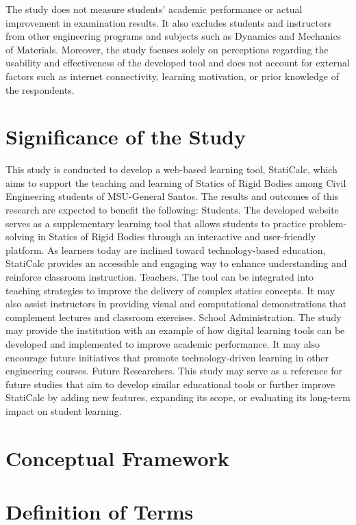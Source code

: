 The study does not measure students’ academic performance or actual improvement in examination results. It also excludes students and instructors from other engineering programs and subjects such as Dynamics and Mechanics of Materials. Moreover, the study focuses solely on perceptions regarding the usability and effectiveness of the developed tool and does not account for external factors such as internet connectivity, learning motivation, or prior knowledge of the respondents.

\section{Significance of the Study}\label{sec:1-sots}

This study is conducted to develop a web-based learning tool, StatiCalc, which aims to support the teaching and learning of Statics of Rigid Bodies among Civil Engineering students of MSU-General Santos. The results and outcomes of this research are expected to benefit the following:
Students. The developed website serves as a supplementary learning tool that allows students to practice problem-solving in Statics of Rigid Bodies through an interactive and user-friendly platform. As learners today are inclined toward technology-based education, StatiCalc provides an accessible and engaging way to enhance understanding and reinforce classroom instruction.
Teachers. The tool can be integrated into teaching strategies to improve the delivery of complex statics concepts. It may also assist instructors in providing visual and computational demonstrations that complement lectures and classroom exercises.
School Administration. The study may provide the institution with an example of how digital learning tools can be developed and implemented to improve academic performance. It may also encourage future initiatives that promote technology-driven learning in other engineering courses.
Future Researchers. This study may serve as a reference for future studies that aim to develop similar educational tools or further improve StatiCalc by adding new features, expanding its scope, or evaluating its long-term impact on student learning.


\section{Conceptual Framework}\label{sec:1-cf}

\section{Definition of Terms}\label{sec:1-dot}

